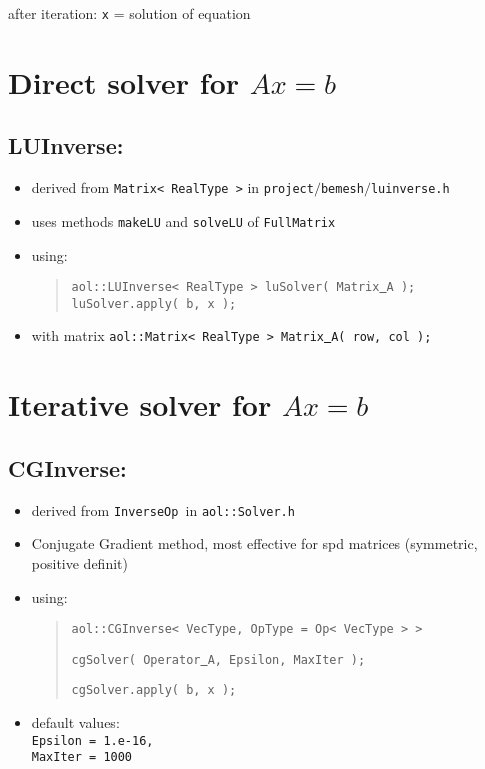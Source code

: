 after iteration: \texttt{x} = solution of equation



\section {Direct solver for $Ax=b$}
\subsection{ LUInverse: }
\begin{itemize}
\item derived from \texttt{Matrix< RealType >} in \texttt{project$/$bemesh$/$luinverse.h}
\item uses methods \texttt{makeLU} and \texttt{solveLU} of \texttt{FullMatrix}
\item using: \begin{quote}
\texttt{aol::LUInverse< RealType > luSolver(  Matrix\underline{ }A  ); \\
luSolver.apply( b, x );} \end{quote}
\item with matrix \texttt{aol::Matrix< RealType > Matrix\underline{ }A( row, col );}
\end{itemize}


\section {Iterative solver for $Ax = b$}
\label{sec:iterativeSolvers}
\subsection{ CGInverse: }
\begin{itemize}
\item derived from \texttt{InverseOp }in \texttt{aol::Solver.h}
\item Conjugate Gradient method, most effective for spd matrices (symmetric, positive definit)
\item using: \begin{quote}
\texttt{aol::CGInverse< VecType, OpType = Op< VecType > >}
\begin{flushright} \texttt{cgSolver( Operator\underline{ }A, Epsilon, MaxIter );} \end{flushright}
\texttt{cgSolver.apply( b, x ); } \end{quote}
\item default values: \\
\texttt{Epsilon = 1.e-16, \\ MaxIter = 1000}
\end{itemize}

